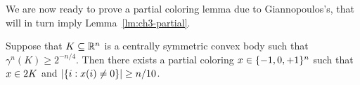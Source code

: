 We are now ready to prove a  partial coloring lemma due to
Giannopoulos's, that will in turn imply Lemma~\ref{lm:ch3-partial}.

\begin{lemma}\label{lm:ch3-gian}
  Suppose that \(K \subseteq \mathbb{R}^n\) is a centrally symmetric convex
  body such that \(\gamma^n(K) \ge  2^{-n/4}\).
  Then there exists a partial coloring \(x \in \{-1, 0, +1\}^n\)
  such that \(x \in 2K\) and \(|\{i: x(i) \neq 0\}| \ge n/10\). 
\end{lemma}
